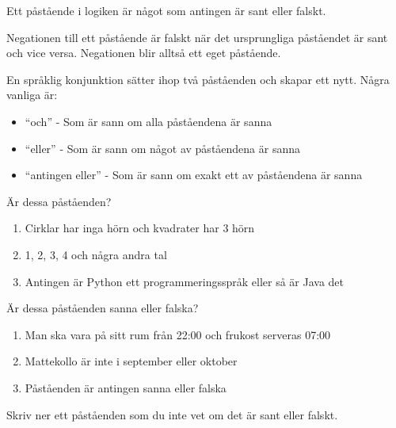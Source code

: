 
\begin{definition}[Påstående]
	Ett påstående i logiken är något som antingen är sant eller falskt.
\end{definition}


\begin{definition}[Negation]
	Negationen till ett påstående är falskt när det ursprungliga påståendet är sant och vice versa. Negationen blir alltså ett eget påstående.
\end{definition}

\begin{definition}
	En språklig konjunktion sätter ihop två påståenden och skapar ett nytt. Några vanliga är:
	\begin{itemize}
		\item ``och'' - Som är sann om alla påståendena är sanna
		\item ``eller'' - Som är sann om något av påståendena är sanna
		\item ``antingen eller'' - Som är sann om exakt ett av påståendena är sanna
	\end{itemize}
\end{definition}

\begin{problem}
	Är dessa påståenden?
	\begin{enumerate}[label=\alph*)]
		\item Cirklar har inga hörn och kvadrater har 3 hörn
		\item 1, 2, 3, 4 och några andra tal
		\item Antingen är Python ett programmeringsspråk eller så är Java det
	\end{enumerate}
\end{problem}


\begin{problem}
	Är dessa påståenden sanna eller falska?
	\begin{enumerate}[label=\alph*)]
		\item Man ska vara på sitt rum från 22:00 och frukost serveras 07:00
		\item Mattekollo är inte i september eller oktober
		\item Påståenden är antingen sanna eller falska
	\end{enumerate}
\end{problem} 


\begin{problem}
	Skriv ner ett påståenden som du inte vet om det är sant eller falskt.
\end{problem}

